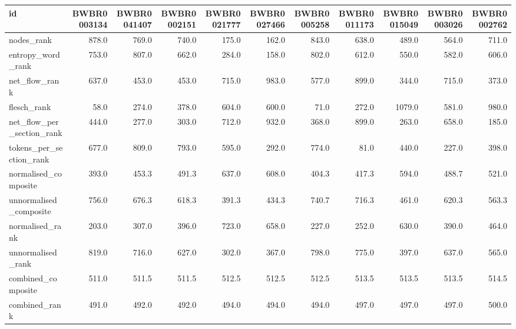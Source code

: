\begin{tabular}{lrrrrrrrrrr}
\toprule
id & BWBR0003134 & BWBR0041407 & BWBR0002151 & BWBR0021777 & BWBR0027466 & BWBR0005258 & BWBR0011173 & BWBR0015049 & BWBR0003026 & BWBR0002762 \\
\midrule
nodes\_rank & 878.0 & 769.0 & 740.0 & 175.0 & 162.0 & 843.0 & 638.0 & 489.0 & 564.0 & 711.0 \\
\cline{1-11}
entropy\_word\_rank & 753.0 & 807.0 & 662.0 & 284.0 & 158.0 & 802.0 & 612.0 & 550.0 & 582.0 & 606.0 \\
\cline{1-11}
net\_flow\_rank & 637.0 & 453.0 & 453.0 & 715.0 & 983.0 & 577.0 & 899.0 & 344.0 & 715.0 & 373.0 \\
\cline{1-11}
flesch\_rank & 58.0 & 274.0 & 378.0 & 604.0 & 600.0 & 71.0 & 272.0 & 1079.0 & 581.0 & 980.0 \\
\cline{1-11}
net\_flow\_per\_section\_rank & 444.0 & 277.0 & 303.0 & 712.0 & 932.0 & 368.0 & 899.0 & 263.0 & 658.0 & 185.0 \\
\cline{1-11}
tokens\_per\_section\_rank & 677.0 & 809.0 & 793.0 & 595.0 & 292.0 & 774.0 & 81.0 & 440.0 & 227.0 & 398.0 \\
\cline{1-11}
normalised\_composite & 393.0 & 453.3 & 491.3 & 637.0 & 608.0 & 404.3 & 417.3 & 594.0 & 488.7 & 521.0 \\
\cline{1-11}
unnormalised\_composite & 756.0 & 676.3 & 618.3 & 391.3 & 434.3 & 740.7 & 716.3 & 461.0 & 620.3 & 563.3 \\
\cline{1-11}
normalised\_rank & 203.0 & 307.0 & 396.0 & 723.0 & 658.0 & 227.0 & 252.0 & 630.0 & 390.0 & 464.0 \\
\cline{1-11}
unnormalised\_rank & 819.0 & 716.0 & 627.0 & 302.0 & 367.0 & 798.0 & 775.0 & 397.0 & 637.0 & 565.0 \\
\cline{1-11}
combined\_composite & 511.0 & 511.5 & 511.5 & 512.5 & 512.5 & 512.5 & 513.5 & 513.5 & 513.5 & 514.5 \\
\cline{1-11}
combined\_rank & 491.0 & 492.0 & 492.0 & 494.0 & 494.0 & 494.0 & 497.0 & 497.0 & 497.0 & 500.0 \\
\cline{1-11}
\bottomrule
\end{tabular}

